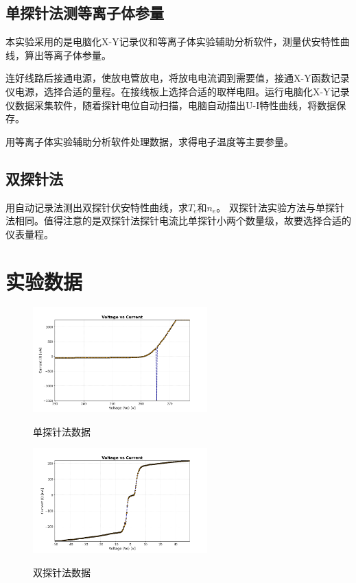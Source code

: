 \documentclass[a4paper]{article}
\begin{document}
\subsection{单探针法测等离子体参量}
本实验采用的是电脑化X-Y记录仪和等离子体实验辅助分析软件，测量伏安特性曲线，算出等离子体参量。

连好线路后接通电源，使放电管放电，将放电电流调到需要值，接通X-Y函数记录仪电源，选择合适的量程。在接线板上选择合适的取样电阻。运行电脑化X-Y记录仪数据采集软件，随着探针电位自动扫描，电脑自动描出U-I特性曲线，将数据保存。

用等离子体实验辅助分析软件处理数据，求得电子温度等主要参量。
\subsection{双探针法}
用自动记录法测出双探针伏安特性曲线，求$T_e$和$n_e$。
双探针法实验方法与单探针法相同。值得注意的是双探针法探针电流比单探针小两个数量级，故要选择合适的仪表量程。

\section{实验数据}
\begin{figure}[!h]
\centering
\includegraphics[width=0.6\textwidth]{data/Figure_1.png}\\
\caption{单探针法数据}\label{fig7}
\end{figure}

\begin{figure}[!h]
\centering
\includegraphics[width=0.6\textwidth]{data/Figure_2.png}\\
\caption{双探针法数据}\label{fig8}
\end{figure}
\end{document}
